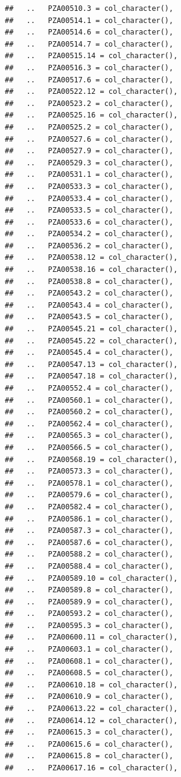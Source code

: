\documentclass[
]{article}
\begin{document}
\begin{verbatim}
##   ..   PZA00510.3 = col_character(),
##   ..   PZA00514.1 = col_character(),
##   ..   PZA00514.6 = col_character(),
##   ..   PZA00514.7 = col_character(),
##   ..   PZA00515.14 = col_character(),
##   ..   PZA00516.3 = col_character(),
##   ..   PZA00517.6 = col_character(),
##   ..   PZA00522.12 = col_character(),
##   ..   PZA00523.2 = col_character(),
##   ..   PZA00525.16 = col_character(),
##   ..   PZA00525.2 = col_character(),
##   ..   PZA00527.6 = col_character(),
##   ..   PZA00527.9 = col_character(),
##   ..   PZA00529.3 = col_character(),
##   ..   PZA00531.1 = col_character(),
##   ..   PZA00533.3 = col_character(),
##   ..   PZA00533.4 = col_character(),
##   ..   PZA00533.5 = col_character(),
##   ..   PZA00533.6 = col_character(),
##   ..   PZA00534.2 = col_character(),
##   ..   PZA00536.2 = col_character(),
##   ..   PZA00538.12 = col_character(),
##   ..   PZA00538.16 = col_character(),
##   ..   PZA00538.8 = col_character(),
##   ..   PZA00543.2 = col_character(),
##   ..   PZA00543.4 = col_character(),
##   ..   PZA00543.5 = col_character(),
##   ..   PZA00545.21 = col_character(),
##   ..   PZA00545.22 = col_character(),
##   ..   PZA00545.4 = col_character(),
##   ..   PZA00547.13 = col_character(),
##   ..   PZA00547.18 = col_character(),
##   ..   PZA00552.4 = col_character(),
##   ..   PZA00560.1 = col_character(),
##   ..   PZA00560.2 = col_character(),
##   ..   PZA00562.4 = col_character(),
##   ..   PZA00565.3 = col_character(),
##   ..   PZA00566.5 = col_character(),
##   ..   PZA00568.19 = col_character(),
##   ..   PZA00573.3 = col_character(),
##   ..   PZA00578.1 = col_character(),
##   ..   PZA00579.6 = col_character(),
##   ..   PZA00582.4 = col_character(),
##   ..   PZA00586.1 = col_character(),
##   ..   PZA00587.3 = col_character(),
##   ..   PZA00587.6 = col_character(),
##   ..   PZA00588.2 = col_character(),
##   ..   PZA00588.4 = col_character(),
##   ..   PZA00589.10 = col_character(),
##   ..   PZA00589.8 = col_character(),
##   ..   PZA00589.9 = col_character(),
##   ..   PZA00593.2 = col_character(),
##   ..   PZA00595.3 = col_character(),
##   ..   PZA00600.11 = col_character(),
##   ..   PZA00603.1 = col_character(),
##   ..   PZA00608.1 = col_character(),
##   ..   PZA00608.5 = col_character(),
##   ..   PZA00610.18 = col_character(),
##   ..   PZA00610.9 = col_character(),
##   ..   PZA00613.22 = col_character(),
##   ..   PZA00614.12 = col_character(),
##   ..   PZA00615.3 = col_character(),
##   ..   PZA00615.6 = col_character(),
##   ..   PZA00615.8 = col_character(),
##   ..   PZA00617.16 = col_character(),

\end{verbatim}
\end{document}
